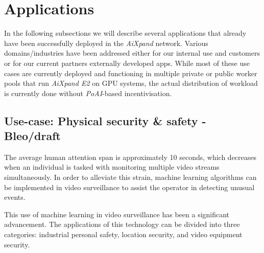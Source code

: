 \documentclass{article}
\begin{document}
\section{Applications}

In the following subsections we will describe several applications that already have been successfully deployed in the \textit{AiXpand} network. Various domains/industries have been addressed either for our internal use and customers or for our current partners externally developed apps. While most of these use cases are currently deployed and functioning in multiple private or public worker pools that run \textit{AiXpand E2} on GPU systems, the actual distribution of workload is currently done without \textit{PoAI}-based incentivisation.

\subsection{Use-case: Physical security \& safety - Bleo/draft}
		    
The average human attention span is approximately 10 seconds, which decreases when an individual is tasked with monitoring multiple video streams simultaneously. In order to alleviate this strain, machine learning algorithms can be implemented in video surveillance to assist the operator in detecting unusual events.

This use of machine learning in video surveillance has been a significant advancement. The applications of this technology can be divided into three categories: industrial personal safety, location security, and video equipment security.
\end{document}
